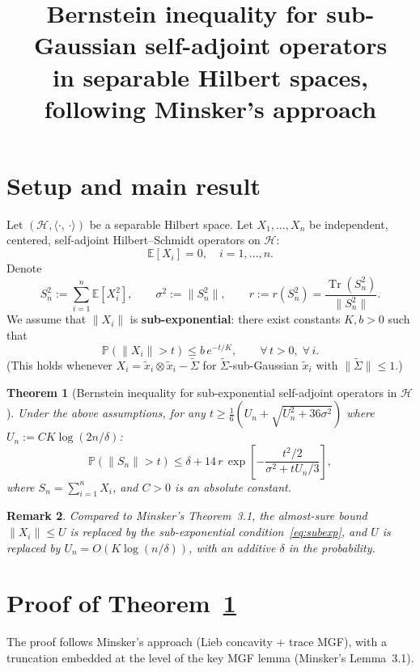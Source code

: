 \documentclass[11pt]{article}
\title{Bernstein inequality for sub-Gaussian self-adjoint operators\\
in separable Hilbert spaces, following Minsker's approach}
\author{}
\date{}
\newtheorem{theorem}{Theorem}
\newtheorem{remark}[theorem]{Remark}
\DeclareMathOperator{\Tr}{Tr}
\newcommand{\E}{\mathbb{E}}
\newcommand{\PP}{\mathbb{P}}
\newcommand{\cH}{\mathcal{H}}
\newcommand{\norm}[1]{\|#1\|}
\newcommand{\ip}[2]{\langle #1,\, #2\rangle}
\begin{document}
\maketitle

\section{Setup and main result}

Let $(\cH,\ip{\cdot}{\cdot})$ be a separable Hilbert space.
Let $X_1,\ldots,X_n$ be independent, centered, self-adjoint Hilbert--Schmidt operators on $\cH$:
\[
\E[X_i]=0,\quad i=1,\ldots,n.
\]
Denote
\[
S_n^2:=\sum_{i=1}^n\E[X_i^2],\qquad \sigma^2:=\norm{S_n^2},\qquad
r:=r(S_n^2)=\frac{\Tr(S_n^2)}{\norm{S_n^2}}.
\]
We assume that $\norm{X_i}$ is \textbf{sub-exponential}: there exist constants $K,b>0$ such that
\begin{equation}\label{eq:subexp}
\PP(\norm{X_i}>t)\leq b\,e^{-t/K},\qquad \forall\,t>0,\;\forall\,i.
\end{equation}
(This holds whenever $X_i=\tilde x_i\otimes\tilde x_i-\tilde\Sigma$ for $\tilde\Sigma$-sub-Gaussian $\tilde x_i$ with $\norm{\tilde\Sigma}\leq 1$.)

\begin{theorem}[Bernstein inequality for sub-exponential self-adjoint operators in $\cH$]\label{thm:main}
Under the above assumptions, for any $t\geq \frac{1}{6}(U_n+\sqrt{U_n^2+36\sigma^2})$ where $U_n:=CK\log(2n/\delta)$:
\begin{equation}\label{eq:main_bound}
\PP\!\left(\norm{S_n}>t\right)\leq \delta + 14\,r\,\exp\!\left[-\frac{t^2/2}{\sigma^2+tU_n/3}\right],
\end{equation}
where $S_n=\sum_{i=1}^n X_i$, and $C>0$ is an absolute constant.
\end{theorem}

\begin{remark}
Compared to Minsker's Theorem~3.1, the almost-sure bound $\norm{X_i}\leq U$ is replaced by the sub-exponential condition~\eqref{eq:subexp}, and $U$ is replaced by $U_n=O(K\log(n/\delta))$, with an additive $\delta$ in the probability.
\end{remark}

\section{Proof of Theorem~\ref{thm:main}}

The proof follows Minsker's approach (Lieb concavity $+$ trace MGF), with a truncation embedded at the level of the key MGF lemma (Minsker's Lemma~3.1).
\end{document}
